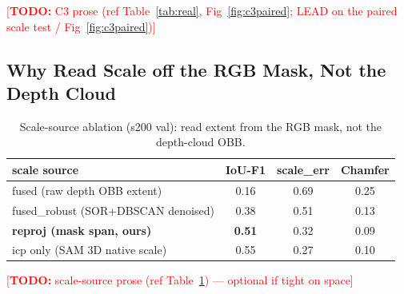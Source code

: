 \documentclass[conference]{IEEEtran}
\newcommand{\todo}[1]{\textcolor{red}{[\textbf{TODO:} #1]}}
\begin{document}
\todo{C3 prose (ref Table~\ref{tab:real}, Fig~\ref{fig:c3paired}; LEAD on the paired scale test / Fig~\ref{fig:c3paired})}

\subsection{Why Read Scale off the RGB Mask, Not the Depth Cloud}

\begin{table}[H]
  \centering
  \caption{Scale-source ablation (s200 val): read extent from the RGB mask,
  not the depth-cloud OBB.}
  \label{tab:scale_source}
  \setlength{\tabcolsep}{6pt}
  \footnotesize
  \begin{tabular}{lccc}
    \toprule
    scale source & IoU-F1 & scale\_err & Chamfer \\
    \midrule
    fused (raw depth OBB extent)        & 0.16 & 0.69 & 0.25 \\
    fused\_robust (SOR+DBSCAN denoised) & 0.38 & 0.51 & 0.13 \\
    \textbf{reproj (mask span, ours)}   & \textbf{0.51} & 0.32 & 0.09 \\
    icp only (SAM 3D native scale)      & 0.55 & 0.27 & 0.10 \\
    \bottomrule
  \end{tabular}
\end{table}

\todo{scale-source prose (ref Table~\ref{tab:scale_source}) — optional if tight on space}
\end{document}
